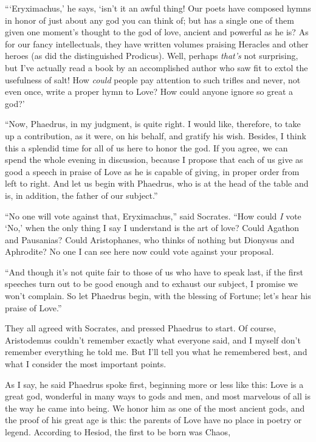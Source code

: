 “‘Eryximachus,’ he says, ‘isn’t it an awful thing! Our poets have
composed hymns in honor of just about any god you can think of; but has
a single one of them given one moment’s thought to the god of
love, ancient and powerful as he is? As for our fancy intellectuals,
they have written volumes praising Heracles and other heroes (as did the
distinguished Prodicus). Well, perhaps {\em that’s} not surprising, but
I’ve actually read a book by an accomplished author who saw fit
to extol the usefulness of salt! How {\em could} people pay attention to
such trifles and never, not even once, write a proper hymn to Love? How
could anyone ignore so great a god?’

“Now, Phaedrus, in my judgment, is quite right. I would like, therefore,
to take up a contribution, as it were, on his behalf, and gratify his
wish. Besides, I think this a splendid time for all of us here
to honor the god. If you agree, we can spend the whole evening in
discussion, because I propose that each of us give as good a speech in
praise of Love as he is capable of giving, in proper order from left to
right. And let us begin with Phaedrus, who is at the head of the table
and is, in addition, the father of our subject.”

“No one will vote against that, Eryximachus,” said Socrates. “How could
{\em I} vote ‘No,’ when the only thing I say I understand is the
art of love? Could Agathon and Pausanias? Could Aristophanes, who thinks
of nothing but Dionysus and Aphrodite? No one I can see here now could
vote against your proposal.

“And though it’s not quite fair to those of us who have to speak last,
if the first speeches turn out to be good enough and to exhaust our
subject, I promise we won’t complain. So let Phaedrus begin, with the
blessing of Fortune; let’s hear his praise of Love.”

They all agreed with Socrates, and pressed Phaedrus to start. Of course,
Aristodemus couldn’t remember exactly what everyone
said, and I myself don’t remember everything he told me. But I’ll tell
you what he remembered best, and what I consider the most important
points.

As I say, he said Phaedrus spoke first, beginning more or less like
this:
\blank[line]
Love is a great god, wonderful in many ways to gods and men, and most
marvelous of all is the way he came into being. We honor him as one of
the most ancient gods, and the proof of his great age is this: the 
parents of Love have no place in poetry or legend. According to
Hesiod, the first to be born was Chaos,

